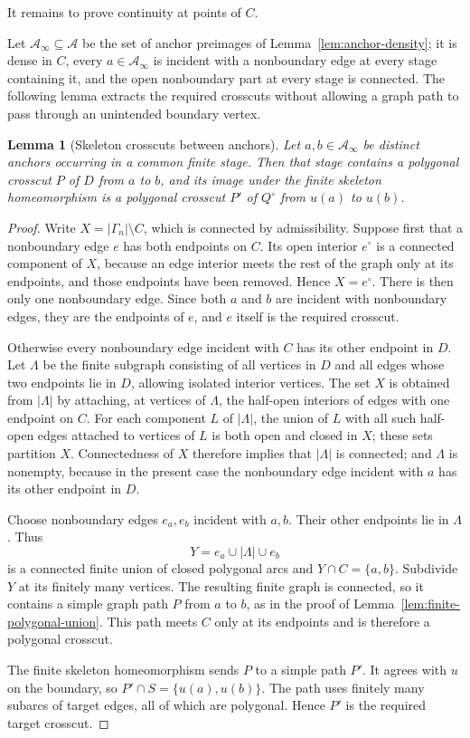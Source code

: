 \documentclass[11pt]{article}
\theoremstyle{mainplain}
\newtheorem{lemma}[theorem]{Lemma}
\theoremstyle{mainroman}
\theoremstyle{definition}
\numberwithin{equation}{section}
\begin{document}
It remains to prove continuity at points of \(C\).

Let \(\mathcal A_\infty\subseteq\mathcal A\) be the set of anchor preimages of
Lemma~\ref{lem:anchor-density}; it is dense in \(C\), every
\(a\in\mathcal A_\infty\) is incident with a nonboundary edge at every stage
containing it, and the open nonboundary part at every stage is
connected. The following lemma extracts the required crosscuts without allowing a graph path to pass through an unintended boundary vertex.

\begin{lemma}[Skeleton crosscuts between anchors]\label{lem:skeleton-crosscuts}
Let \(a,b\in\mathcal A_\infty\) be distinct anchors occurring in a common finite stage. Then that stage contains a polygonal crosscut \(P\) of \(D\) from \(a\) to \(b\), and its image under the finite skeleton homeomorphism is a polygonal crosscut \(P'\) of \(Q^\circ\) from \(u(a)\) to \(u(b)\).
\end{lemma}
\begin{proof}
Write \(X=|\Gamma_n|\setminus C\), which is connected by admissibility. Suppose first that a nonboundary edge \(e\) has both endpoints on \(C\). Its open interior \(e^\circ\) is a connected component of \(X\), because an edge interior meets the rest of the graph only at its endpoints, and those endpoints have been removed. Hence \(X=e^\circ\). There is then only one nonboundary edge. Since both \(a\) and \(b\) are incident with nonboundary edges, they are the endpoints of \(e\), and \(e\) itself is the required crosscut.

Otherwise every nonboundary edge incident with \(C\) has its other endpoint in \(D\). Let \(\Lambda\) be the finite subgraph consisting of all vertices in \(D\) and all edges whose two endpoints lie in \(D\), allowing isolated interior vertices. The set \(X\) is obtained from \(|\Lambda|\) by attaching, at vertices of \(\Lambda\), the half-open interiors of edges with one endpoint on \(C\). For each component \(L\) of \(|\Lambda|\), the union of \(L\) with all such half-open edges attached to vertices of \(L\) is both open and closed in \(X\); these sets partition \(X\). Connectedness of \(X\) therefore implies that \(|\Lambda|\) is connected; and \(\Lambda\) is nonempty, because in the present case the nonboundary edge incident with \(a\) has its other endpoint in \(D\).

Choose nonboundary edges \(e_a,e_b\) incident with \(a,b\). Their other endpoints lie in \(\Lambda\). Thus
\[
 Y=e_a\cup|\Lambda|\cup e_b
\]
is a connected finite union of closed polygonal arcs and \(Y\cap C=\{a,b\}\). Subdivide \(Y\) at its finitely many vertices. The resulting finite graph is connected, so it contains a simple graph path \(P\) from \(a\) to \(b\), as in the proof of Lemma~\ref{lem:finite-polygonal-union}. This path meets \(C\) only at its endpoints and is therefore a polygonal crosscut.

The finite skeleton homeomorphism sends \(P\) to a simple path \(P'\). It agrees with \(u\) on the boundary, so \(P'\cap S=\{u(a),u(b)\}\). The path uses finitely many subarcs of target edges, all of which are polygonal. Hence \(P'\) is the required target crosscut.
\end{proof}
\end{document}
